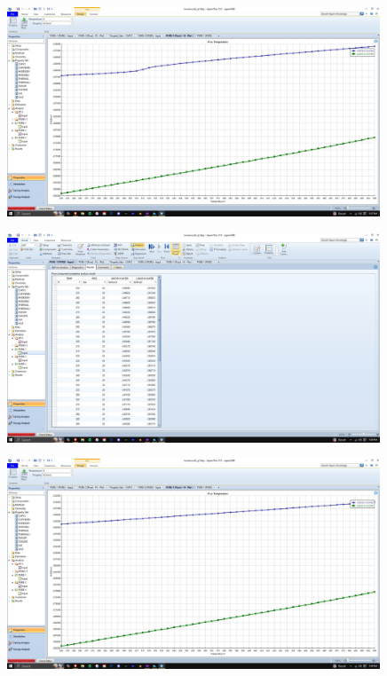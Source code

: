 \documentclass{article}
\begin{document}
\begin{figure}[H]
    \centering
    \includegraphics[width=0.99\textwidth, frame]{img/4 (H graph 20bar).JPG}
\end{figure}

\begin{figure}[H]
    \centering
    \includegraphics[width=0.99\textwidth, frame]{img/5 (H table).JPG}
\end{figure}

\begin{figure}[H]
    \centering
    \includegraphics[width=0.99\textwidth, frame]{img/6 (H 2bar).JPG}
\end{figure}
\end{document}
